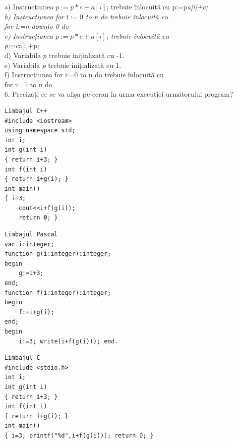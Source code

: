 \documentclass[10pt]{article}
\begin{document}
a) Instrucțiunea $p:=p * c+a[i]$; trebuie înlocuită cu p:=p\textit{a[i]+c;\\
b) Instrucțiunea for $\mathrm{i}:=0$ to n do trebuie înlocuită cu\\
for i:=n downto 0 do\\
c) Instrucțiunea $p:=p * c+a[i]$; trebuie înlocuită cu\\
p:=c}a[i]+p;\\
d) Variabila $p$ trebuie inițializată cu -1.\\
e) Variabila $p$ trebuie inițializată cu 1.\\
f) Instrucțiunea for i:=0 to n do trebuie înlocuită cu\\
for i:=1 to n do\\
6. Precizați ce se va afișa pe ecran în urma execuției următorului program?

\begin{verbatim}
Limbajul C++
#include <iostream>
using namespace std;
int i;
int g(int i)
{ return i+3; }
int f(int i)
{ return i+g(i); }
int main()
{ i=3;
    cout<<i+f(g(i));
    return 0; }
\end{verbatim}

\begin{verbatim}
Limbajul Pascal
var i:integer;
function g(i:integer):integer;
begin
    g:=i+3;
end;
function f(i:integer):integer;
begin
    f:=i+g(i);
end;
begin
    i:=3; write(i+f(g(i))); end.
\end{verbatim}

\begin{verbatim}
Limbajul C
#include <stdio.h>
int i;
int g(int i)
{ return i+3; }
int f(int i)
{ return i+g(i); }
int main()
{ i=3; printf("%d",i+f(g(i))); return 0; }
\end{verbatim}
\end{document}
